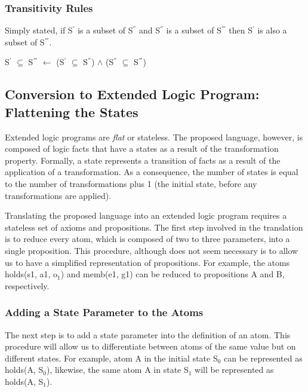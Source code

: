 \documentclass[a4paper]{article}
\begin{document}
      \subsubsection{Transitivity Rules}

        Simply stated, if S$^{'}$ is a subset of S$^{''}$ and S$^{''}$ is a
        subset of S$^{'''}$ then S$^{'}$ is also a subset of S$^{'''}$.

        \begin{list}{}{}
          \item
            S$^{'}$ $\subseteq$ S$^{'''}$ $\leftarrow$
            (S$^{'}$ $\subseteq$ S$^{''}$) $\land$ 
            (S$^{''}$ $\subseteq$ S$^{'''}$)
        \end{list}

    \subsection{Conversion to Extended Logic Program: Flattening the States}

      Extended logic programs are \emph{flat} or stateless. The proposed
      language, however, is composed of logic facts that have a states as
      a result of the transformation property. Formally, a state represents
      a transition of facts as a result of the application of a transformation.
      As a consequence, the number of states is equal to the number of
      transformations plus 1 (the initial state, before any transformations
      are applied).

      Translating the proposed language into an extended logic program requires
      a stateless set of axioms and propositions. The first step involved in
      the translation is to reduce every atom, which is composed of two to
      three parameters, into a single proposition. This procedure, although
      does not seem necessary is to allow us to have a simplified
      representation of propositions. For example, the atoms holds(s1, a1, 
      o$_{1}$) and memb(e1, g1) can be reduced to propositions A and B,
      respectively.

      \subsubsection{Adding a State Parameter to the Atoms}

        The next step is to add a state parameter into the definition of an
        atom. This procedure will allow us to differentiate between atoms of
        the same value but on different states. For example, atom A in 
        the initial state S$_0$ can be represented as holds(A, S$_0$),
        likewise, the same atom A in state S$_1$ will be represented as
        holds(A, S$_1$).
\end{document}

